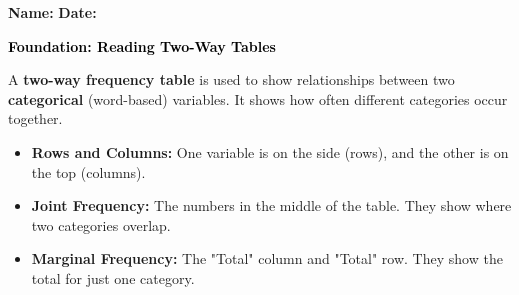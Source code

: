\documentclass[12pt, letterpaper, fleqn]{article}
\begin{document}
\textbf{Name:} \underline{\hspace{5cm}}
\hfill
\textbf{Date:} \underline{\hspace{3cm}}\\

\begin{tcolorbox}[colback=customteal!20]
    \large\textcolor{black}{\textbf{Foundation: Reading Two-Way Tables}}
\end{tcolorbox}

\vspace{3mm}

\noindent
A \textbf{two-way frequency table} is used to show relationships between two \textbf{categorical} (word-based) variables. It shows how often different categories occur together.

\begin{itemize}
    \item \textbf{Rows and Columns:} One variable is on the side (rows), and the other is on the top (columns).
    \item \textbf{Joint Frequency:} The numbers in the middle of the table. They show where two categories overlap.
    \item \textbf{Marginal Frequency:} The "Total" column and "Total" row. They show the total for just one category.
\end{itemize}

\vspace{4mm}
\end{document}
